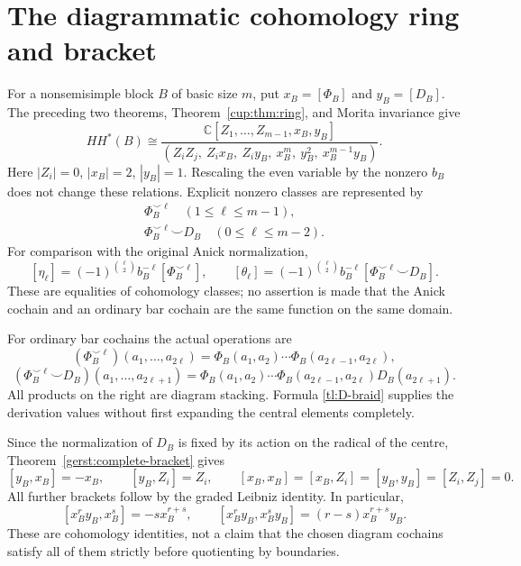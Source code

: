 \documentclass[a4paper,11pt,oneside,reqno]{amsart}
\theoremstyle{definition}
\numberwithin{equation}{section}
\begin{document}
	\section{The diagrammatic cohomology ring and bracket}\label{tl:diagramring}
	For a nonsemisimple block $B$ of basic size $m$, put
	$x_B=[\Phi_B]$ and $y_B=[D_B]$.  The preceding two theorems,
	Theorem~\ref{cup:thm:ring}, and Morita invariance give
	\begin{equation}\label{tl:block-ring}
		\boxed{HH^*(B)\cong
			\frac{\mathbb C[Z_1,\ldots,Z_{m-1},x_B,y_B]}
			{(Z_iZ_j,\ Z_ix_B,\ Z_iy_B,\ x_B^m,\ y_B^2,\ x_B^{m-1}y_B)}.}
	\end{equation}
	Here $|Z_i|=0$, $|x_B|=2$, $|y_B|=1$.  Rescaling the even
	variable by the nonzero $b_B$ does not change these relations.
	Explicit nonzero classes are represented by
	\begin{equation}\label{tl:all-representatives}
		\begin{gathered}
			\Phi_B^{\smile\ell}\quad(1\le\ell\le m-1),\\
			\Phi_B^{\smile\ell}\smile D_B\quad(0\le\ell\le m-2).
		\end{gathered}
	\end{equation}
	For comparison with the original Anick normalization,
	\[
	[\eta_\ell]=(-1)^{\binom\ell2}b_B^{-\ell}
	[\Phi_B^{\smile\ell}],\qquad
	[\theta_\ell]=(-1)^{\binom\ell2}b_B^{-\ell}
	[\Phi_B^{\smile\ell}\smile D_B].
	\]
	These are equalities of cohomology classes; no assertion is made
	that the Anick cochain and an ordinary bar cochain are the same
	function on the same domain.
	
	For ordinary bar cochains the actual operations are
	\[
	(\Phi_B^{\smile\ell})(a_1,\ldots,a_{2\ell})
	=\Phi_B(a_1,a_2)\cdots\Phi_B(a_{2\ell-1},a_{2\ell}),
	\]
	\[
	(\Phi_B^{\smile\ell}\smile D_B)(a_1,\ldots,a_{2\ell+1})
	=\Phi_B(a_1,a_2)\cdots\Phi_B(a_{2\ell-1},a_{2\ell})D_B(a_{2\ell+1}).
	\]
	All products on the right are diagram stacking.  Formula
	\eqref{tl:D-braid} supplies the derivation values without first
	expanding the central elements completely.
	
	Since the normalization of $D_B$ is fixed by its action on the
	radical of the centre, Theorem~\ref{gerst:complete-bracket} gives
	\begin{equation}\label{tl:bracket}
		[y_B,x_B]=-x_B,\qquad [y_B,Z_i]=Z_i,
		\qquad [x_B,x_B]=[x_B,Z_i]=[y_B,y_B]=[Z_i,Z_j]=0.
	\end{equation}
	All further brackets follow by the graded Leibniz identity.  In
	particular,
	\[
	[x_B^ry_B,x_B^s]=-s x_B^{r+s},\qquad
	[x_B^ry_B,x_B^sy_B]=(r-s)x_B^{r+s}y_B.
	\]
	These are cohomology identities, not a claim that the chosen diagram
	cochains satisfy all of them strictly before quotienting by boundaries.
	
\end{document}
